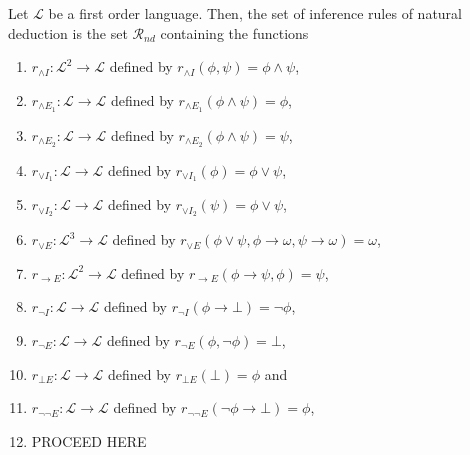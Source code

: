 \begin{definition}%
    Let $\mathcal{L}$ be a first order language. Then, the set of inference rules of natural deduction is the set $\mathcal{R}_{nd}$ containing the functions 
    \begin{enumerate}
        \item $r_{\land I} : \mathcal{L}^2 \to \mathcal{L}$ defined by $r_{\land I}(\phi,\psi) = \phi \land \psi$,
        \item $r_{\land E_1} : \mathcal{L} \to \mathcal{L}$ defined by $r_{\land E_1}(\phi \land \psi) = \phi$,
        \item $r_{\land E_2} : \mathcal{L} \to \mathcal{L}$ defined by $r_{\land E_2}(\phi \land \psi) = \psi$,
        \item $r_{\lor I_1} : \mathcal{L} \to \mathcal{L}$ defined by $r_{\lor I_1}(\phi) = \phi \lor \psi$,
        \item $r_{\lor I_2} : \mathcal{L} \to \mathcal{L}$ defined by $r_{\lor I_2}(\psi) = \phi \lor \psi$,
        \item $r_{\lor E} : \mathcal{L}^3 \to \mathcal{L}$ defined by $r_{\lor E}(\phi \lor \psi, \phi \to \omega, \psi \to \omega)=\omega$,
        \item $r_{\to E} : \mathcal{L}^2 \to \mathcal{L}$ defined by $r_{\to E}(\phi \to \psi, \phi)=\psi$,
        \item $r_{\neg I} : \mathcal{L} \to \mathcal{L}$ defined by $r_{\neg I}(\phi \to \bot) = \neg \phi$,
        \item $r_{\neg E} : \mathcal{L} \to \mathcal{L}$ defined by $r_{\neg E}(\phi, \neg \phi)= \bot$,
        \item $r_{\bot E} : \mathcal{L} \to \mathcal{L}$ defined by $r_{\bot E}(\bot)=\phi$ and
        \item $r_{\neg \neg E} : \mathcal{L} \to \mathcal{L}$ defined by $r_{\neg \neg E}(\neg \phi \to \bot)=\phi$,
        \item PROCEED HERE
    \end{enumerate}
\end{definition}

